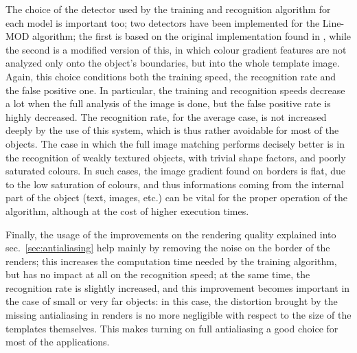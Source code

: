 The choice of the detector used by the training and recognition
algorithm for each model is important too; two detectors have been
implemented for the Line-MOD algorithm; the first is based on the
original implementation found in \cite{linemod-paper}, while the
second is a modified version of this, in which colour gradient
features are not analyzed only onto the object's boundaries, but into
the whole template image. Again, this choice conditions both the
training speed, the recognition rate and the false positive one. In
particular, the training and recognition speeds decrease a lot when
the full analysis of the image is done, but the false positive rate is
highly decreased. The recognition rate, for the average case, is not
increased deeply by the use of this system, which is thus rather
avoidable for most of the objects. The case in which the full image
matching performs decisely better is in the recognition of weakly
textured objects, with trivial shape factors, and poorly saturated
colours. In such cases, the image gradient found on borders is flat,
due to the low saturation of colours, and thus informations coming
from the internal part of the object (text, images, etc.) can be vital
for the proper operation of the algorithm, although at the cost of
higher execution times.

Finally, the usage of the improvements on the rendering quality
explained into sec.~\ref{sec:antialiasing} help mainly by removing the noise on
the border of the renders; this increases the computation time
needed by the training algorithm, but has no impact at all on the
recognition speed; at the same time, the recognition rate is slightly
increased, and this improvement becomes important in the case of small
or very far objects: in this case, the distortion brought by the
missing antialiasing in renders is no more negligible with respect to
the size of the templates themselves. This makes turning on full
antialiasing a good choice for most of the applications.

